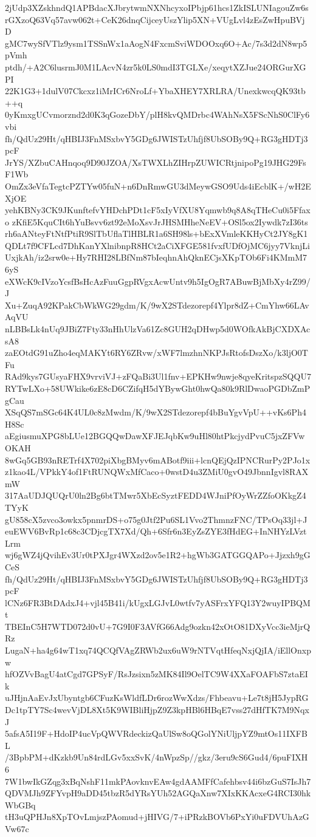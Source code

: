 2jUdp3XZskhndQ1APBdacXJbrytwmNXNhcyxoIPbjp61hcs1ZkISLUNIagouZw6s
rGXzoQ63Vq57avw062t+CeK26dnqCijceyUszYlip5XN+VUgLvl4zEsZwHpuBVjD
gMC7wySfVTlz9ysm1TSSnWx1aAogN4FxcmSviWDOOxq6O+Ac/7s3d2dN8wp5pVmh
ptdh/+A2C6lusrmJ0M1LAcvN4zr5k0LS0mdI3TGLXe/xeqytXZJue24ORGurXGPI
22K1G3+1dulV07Ckcxz1iMrICr6NroLf+YbaXHEY7XRLRA/UnexkwcqQK93tb++q
0yKmxgUCvmorznd2d0K3qGozeDbY/plH8kvQMDrbc4WAhNsX5FScNhS0ClFy6vbi
fh/QdUz29Ht/qHBIJ3FnMSxbvY5GDg6JWISTzUhfjf8UbSOBy9Q+RG3gHDTj3pcF
JrYS/XZbuCAHnqoq9D90JZOA/XsTWXLhZIHrpZUWICRtjnipoPg19JHG29FsF1Wb
OmZx3eVfaTegtcPZTYw05fuN+n6DnRmwGU3dMeywGSO9Uds4iEcblK+/wH2EXjOE
yehKBNy3CK9JKunftefvYHDchPDt1cF5xIyVfXU8Yqmwb9q8A8qTHeCu0i5Ffaxo
zKfiE5KquCIt6hYuBsvv6zt92eMoXsvJrJHSMHheNeEV+OSl5ox2Iywdk7zI36ts
rh6aANteyFtNtfPtiR9SlTbUflaTlHBLR1a6SH98ls+bExXVmleKKHyCt2JY8gK1
QDLt7f9CFLcd7DhKanYXlnibnpR8HCt2aCiXFGE581fvxfUDfOjMC6jyy7VknjLi
UxjkAh/iz2srw0e+Hy7RHI28LBfNm87bIeqhnAhQknECjsXKpTOb6Fi4KMmM76yS
eXWcK9cIVzoYcsfBsHcAzFuuGgpRVgxAcwUntv9h5IgOgR7ABuwBjMbXy4rZ99/J
Xu+ZuqA92KPakCbWkWG29gdm/K/9wX2STdezorepf4Ylpr8dZ+CmYhw66LAvAqVU
nLBBsLk4nUq9JBiZ7Fty33nHhUlzVa61Zc8GUH2qDHwp5d0WOfkAkBjCXDXAcsA8
zaEOtdG91uZho4eqMAKYt6RY6ZRvw/xWF7lmzhnNKPJsRtofsDszXo/k3ljO0TFu
RAd9kys7GUsyaFHX9vrviVJ+zFQaBi3Ul1fnv+EPKHw9nwje8qyeKritspzSQQU7
RYTwLXo+58UWkike6zE8cD6CZifqH5dYBywGht0hwQa80k9RlDwaoPGDbZmPgCau
XSqQS7mSGc64K4UL0c8zMwdm/K/9wX2STdezorepf4bBuYgvVpU++vKs6Ph4H8Sc
aEgiusmuXPG8bLUe12BGQQwDawXFJEJqbKw9uHl80htPkcjydPvuC5jxZFVwOKAH
8wGq5GB93nRETrf4X702piXbgBMyv6mABotf9iii+lcnQEjQzIPNCRurPy2PJo1x
z1kao4L/VPkkY4of1FtRUNQWxMfCaco+0wstD4u3ZMiU0gvO49JbnnIgvl8RAXmW
317AaUDJQUQrU0ln2Bg6btTMwr5XbEcSyztFEDD4WJniPfOyWrZZfoOKkgZ4TYyK
gU858cX5zvco3owkx5pnmrDS+o75g0Jtf2Pu6SL1Vvo2ThmnzFNC/TPsOq33jl+J
euEWV6BvRp1c68c3CDjcgTX7Xd/Qh+6Sfr6n3EyZsZYE3fHdEG+InNHYzLVztLrm
wj6gWZ4jQvihEv3Ur0tPXJgr4WXzd2ov5e1R2+hgWb3GATGGQAPo+Jjzxh9gGCeS
fh/QdUz29Ht/qHBIJ3FnMSxbvY5GDg6JWISTzUhfjf8UbSOBy9Q+RG3gHDTj3pcF
lCNz6FR3BtDAdxJ4+vjl45B41i/kUgxLGJvL0wtfv7yASFrxYFQ13Y2wuyIPBQMt
TBEInC5H7WTD072d0vU+7G9I0F3AVfG66Adg9ozkn42xOtO81DXyVcc3ieMjrQRz
LugaN+ha4g64wT1xq74QCQfVAgZRWb2ux6uW9rNTVqtHfeqNxjQjIA/iEllOnxpw
hfOZVvBagU4atCgd7GPSyF/RsJzsixn5zMK84Il9OelTC9W4XXaFOAFbS7ztaEIk
uJHjnAaEvJxUbyntgb6CFuzKsWldfLDr6rozWwXdzs/Fhbeavu+Le7t8jH5JypRG
Dc1tpTY7Sc4wevVjDL8Xt5K9WIBliHjpZ9Z3kpHBl6HBqE7vss27dHfTK7M9NqxJ
5afsA5I19F+HdoIP4ucVpQWVRdeckizQaUlSw8oQGolYNiUljpYZ9mtOs11IXFBL
/3BpbPM+dKzkb9Un84rdLGv5xxSvK/4nWpzSp//gkz/3eru9cS6Gud4/6puFIXH6
7W1bwIkGZqg3xBqNshF11mkPAovknvEAw4gdAAMFfCafehbsv44i6bzGuS7IsJh7
QDVMJh9ZFYvpH9aDD45tbzR5dYRsYUh52AGQaXnw7XIxKKAcxeG4RCI30hkWbGBq
tH3uQPHJn8XpTOvLmjszPAomud+jHIVG/7+iPRzkBOVb6PxYi0uFDVUhAzGVw67c
